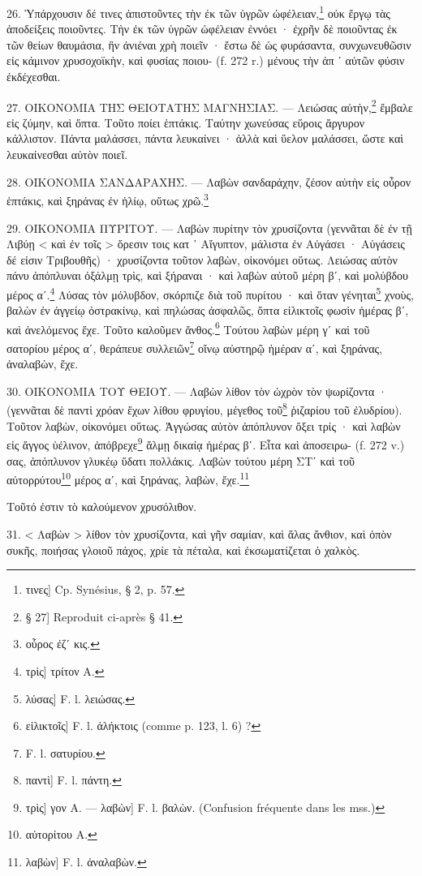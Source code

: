 \documentclass[a4paper, 11pt, oneside, polutonikogreek, french]{article}
\begin{document}
26. Ὑπάρχουσιν δέ τινες ἀπιστοῦντες τὴν ἐκ τῶν ὑγρῶν ὠφέλειαν,\footnote{τινες] Cp. Synésius, § 2, p. 57.} οὐκ ἔργῳ τὰς ἀποδείξεις ποιοῦντες. Τὴν ἐκ τῶν ὑγρῶν ὠφέλειαν ἐννόει · ἐχρῆν δὲ ποιοῦντας ἐκ τῶν θείων θαυμάσια, ἣν ἀνιέναι χρὴ ποιεῖν · ἔστω δὲ ὡς φυράσαντα, συνχωνευθῶσιν εἰς κάμινον χρυσοχοϊκὴν, καὶ φυσίας ποιου- (f. 272 r.) μένους τὴν ἀπ ᾽ αὐτῶν φύσιν ἐκδέχεσθαι.

27. ΟΙΚΟΝΟΜΙΑ ΤΗΣ ΘΕΙΟΤΑΤΗΣ ΜΑΓΝΗΣΙΑΣ. --- Λειώσας αὐτὴν,\footnote{§ 27] Reproduit ci-après § 41.} ἔμβαλε εἰς ζύμην, καὶ ὄπτα. Τοῦτο ποίει ἑπτάκις. Ταύτην χωνεύσας εὕροις ἄργυρον κάλλιστον. Πάντα μαλάσσει, πάντα λευκαίνει · ἀλλὰ καὶ ὕελον μαλάσσει, ὥστε καὶ λευκαίνεσθαι αὐτὸν ποιεῖ.

28. ΟΙΚΟΝΟΜΙΑ ΣΑΝΔΑΡΑΧΗΣ. --- Λαβὼν σανδαράχην, ζέσον αὐτὴν εἰς οὖρον ἑπτάκις, καὶ ξηράνας ἐν ἡλίῳ, οὕτως χρῶ.\footnote{οὗρος ἐζʹ κις.}

29. ΟΙΚΟΝΟΜΙΑ ΠΥΡΙΤΟΥ. --- Λαβὼν πυρίτην τὸν χρυσίζοντα (γεννᾶται δὲ ἐν τῇ Λιβύῃ < καὶ ἐν τοῖς > ὄρεσιν τοις κατ ᾽ Αἴγυπτον, μάλιστα ἐν Αὐγάσει · Αὐγάσεις δέ εἰσιν Τριβουθῆς) · χρυσίζοντα τοῦτον λαβὼν, οἰκονόμει οὕτως. Λειώσας αὐτὸν πάνυ ἀπόπλυναι ὀξάλμῃ τρὶς, καὶ ξήραναι · καὶ λαβὼν αὐτοῦ μέρη βʹ, καὶ μολύβδου μέρος αʹ.\footnote{τρὶς] τρίτον A.} Λύσας τὸν μόλυβδον, σκόρπιζε διὰ τοῦ πυρίτου · καὶ ὅταν γένηται\footnote{λύσας] F. l. λειώσας.} χνοὺς, βαλὼν ἐν ἀγγείῳ ὀστρακίνῳ, καὶ πηλώσας ἀσφαλῶς, ὄπτα εἱλικτοῖς φωσὶν ἡμέρας βʹ, καὶ ἀνελόμενος ἔχε. Τοῦτο καλοῦμεν ἄνθος.\footnote{εἱλικτοῖς] F. l. ἀλήκτοις (comme p. 123, l. 6) ?} Τούτου λαβὼν μέρη γʹ καὶ τοῦ σατορίου μέρος αʹ, θεράπευε συλλειῶν\footnote{F. l. σατυρίου.} οἴνῳ αὐστηρῷ ἡμέραν αʹ, καὶ ξηράνας, ἀναλαβὼν, ἔχε.

30. ΟΙΚΟΝΟΜΙΑ ΤΟΥ ΘΕΙΟΥ. --- Λαβὼν λίθον τὸν ὠχρὸν τὸν ψωρίζοντα · (γεννᾶται δὲ παντὶ χρόαν ἔχων λίθου φρυγίου, μέγεθος τοῦ\footnote{παντὶ] F. l. πάντη.} ῥιζαρίου τοῦ ἐλυδρίου). Τοῦτον λαβὼν, οἰκονόμει οὕτως. Ἀγγώσας αὐτὸν ἀπόπλυνον ὄξει τρίς · καὶ λαβὼν εἰς ἄγγος ὑέλινον, ἀπόβρεχε\footnote{τρὶς] γον A. --- λαβὼν] F. l. βαλὼν. (Confusion fréquente dans les mss.)} ἅλμῃ δικαίᾳ ἡμέρας βʹ. Εἶτα καὶ ἀποσειρω- (f. 272 v.) σας, ἀπόπλυνον γλυκέῳ ὕδατι πολλάκις. Λαβὼν τούτου μέρη ΣΤʹ καὶ τοῦ αὐτορρύτου\footnote{αὐτορίτου A.} μέρος αʹ, καὶ ξηράνας, λαβὼν, ἔχε.\footnote{λαβὼν] F. l. ἀναλαβὼν.}

Τοῦτό ἐστιν τὸ καλούμενον χρυσόλιθον.

31. < Λαβὼν > λίθον τὸν χρυσίζοντα, καὶ γῆν σαμίαν, καὶ ἅλας ἄνθιον, καὶ ὀπὸν συκῆς, ποιήσας γλοιοῦ πάχος, χρίε τὰ πέταλα, καὶ ἐκσωματίζεται ὁ χαλκὸς.
\end{document}
